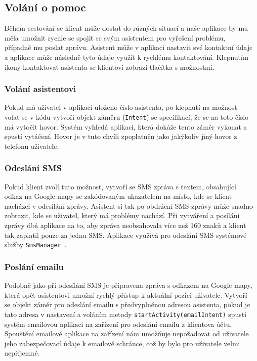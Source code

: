 \documentclass[czech,master,public,dept460,male,java,cpdeclaration]{diploma}
\begin{document}
\subsection{Volání o pomoc}
Během cestování se klient může dostat do různých situací a naše aplikace by mu měla umožnit rychle se
spojit se svým asistentem pro vyřešení problému, případně mu poslat zprávu. Asistent může v aplikaci nastavit své kontaktní
údaje a aplikace může následně tyto údaje využít k rychlému kontaktování. Klepnutím ikony kontaktovat
asistenta se klientovi zobrazí tlačítka s možnostmi.

\subsubsection{Volání asistentovi}
Pokud má uživatel v aplikaci uloženo číslo asistenta, po klepnutí na možnost volat se v kódu vytvoří
 objekt záměru (\texttt{Intent}) se specifikací, že se na toto číslo má vytočit hovor. Systém vyhledá aplikaci,
 která dokáže tento záměr vykonat a spustí vytáčení.
 Hovor je v tuto chvíli zpoplatněn jako jakýkoliv jiný hovor z telefonu uživatele.

\subsubsection{Odeslání SMS}
Pokud klient zvolí tuto možnost, vytvoří se SMS zpráva s textem, obsahující odkaz na Google mapy
se zakódovaným ukazatelem na místo, kde se klient nacházel v odesílání zprávy. Asistent si tak po obdržení
SMS zprávy může snadno zobrazit, kde se uživatel, který má problémy nachází. Při vytváření a posílání zprávy
dbá aplikace na to, aby zpráva neobsahovala více než 160 znaků a klient tak zaplatil pouze za jednu SMS.
Aplikace využívá pro odeslání SMS systémové služby \texttt{SmsManager}~\cite{androiddevelopers}.

\subsubsection{Poslání emailu}
Podobně jako při odesílání SMS je připravena zpráva s odkazem na Google mapy, která opět asistentovi
umožní rychlý přístup k aktuální pozici uživatele. Vytvoří se objekt záměr pro odeslání emailu s předvyplněnou
adresou asistenta, pokud je tato adresa v nastavení a voláním metody \texttt{startActivity(emailIntent)}
spustí systém emailovou aplikaci na zařízení pro odeslání
emailu z klientova účtu. Spouštění emailové aplikace na zařízení nám umožňuje nepožadovat
od uživatele jeho zabezpečovací údaje k emailové schránce, což by bylo pro uživatele velmi nepříjemné.
\end{document}
